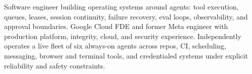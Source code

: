 


Software engineer building operating systems around agents: tool execution, queues, leases, session continuity, failure recovery, eval loops, observability, and approval boundaries. Google Cloud FDE and former Meta engineer with production platform, integrity, cloud, and security experience. Independently operates a live fleet of six always-on agents across repos, CI, scheduling, messaging, browser and terminal tools, and credentialed systems under explicit reliability and safety constraints.







